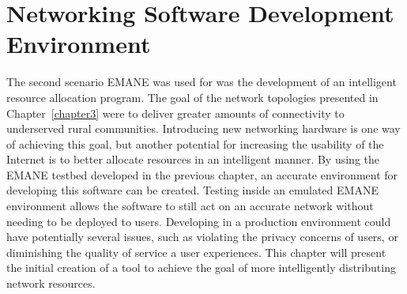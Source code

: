 \chapter{Networking Software Development Environment}
\label{chapter4}
The second scenario EMANE was used for was the development of an intelligent resource allocation program.
The goal of the network topologies presented in Chapter~\ref{chapter3} were to deliver greater amounts of connectivity to underserved rural communities.
Introducing new networking hardware is one way of achieving this goal, but another potential for increasing the usability of the Internet is to better allocate resources in an intelligent manner.
By using the EMANE testbed developed in the previous chapter, an accurate environment for developing this software can be created.
Testing inside an emulated EMANE environment allows the software to still act on an accurate network without needing to be deployed to users.
Developing in a production environment could have potentially several issues, such as violating the privacy concerns of users, or diminishing the quality of service a user experiences.
This chapter will present the initial creation of a tool to achieve the goal of more intelligently distributing network resources.

